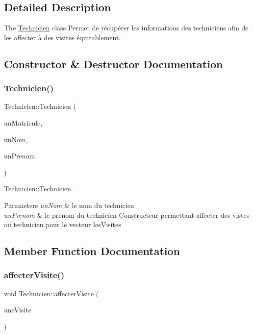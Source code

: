 \subsection{Detailed Description}
The \hyperlink{class_technicien}{Technicien} class Permet de récupérer les informations des techniciens afin de les affecter à des visites équitablement. 

\subsection{Constructor \& Destructor Documentation}
\mbox{\label{class_technicien_a2b13414c79a7a4f040522c34e0fd0aa6}} 
\subsubsection{\texorpdfstring{Technicien()}{Technicien()}}
{\footnotesize\ttfamily Technicien\+::\+Technicien (\begin{DoxyParamCaption}\item[{int}]{un\+Matricule,  }\item[{Q\+String}]{un\+Nom,  }\item[{Q\+String}]{un\+Prenom }\end{DoxyParamCaption})}



Technicien\+::\+Technicien. 


\begin{DoxyParams}{Parameters}
{\em un\+Nom} & le nom du technicien \\
\hline
{\em un\+Prenom} & le prenom du technicien Constructeur permettant affecter des vistes au technicien pour le vecteur les\+Visites \\
\hline
\end{DoxyParams}


\subsection{Member Function Documentation}
\mbox{\label{class_technicien_ae214082b07ffa459ebfb99e9efd4da20}} 
\subsubsection{\texorpdfstring{affecter\+Visite()}{affecterVisite()}}
{\footnotesize\ttfamily void Technicien\+::affecter\+Visite (\begin{DoxyParamCaption}\item[{\hyperlink{classvisite}{visite} $\ast$}]{une\+Visite }\end{DoxyParamCaption})}



